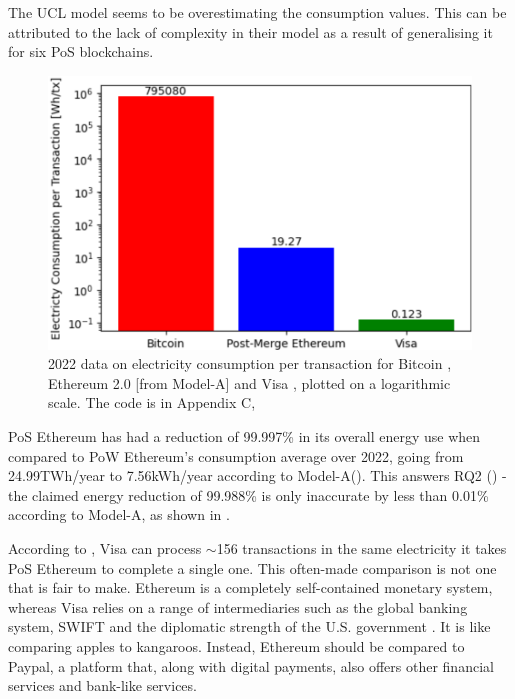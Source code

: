 The UCL model seems to be overestimating the consumption values. This can be attributed to the lack of complexity in their model as a result of generalising it for six PoS blockchains.

\begin{figure}[!htb]
    \includegraphics[width=13cm,center]{Figures/ElectricityConsumptionPlot.png}
    \caption{2022 data on electricity consumption per transaction for Bitcoin \cite{BitcoinDigiconomist}, Ethereum 2.0 [from Model-A] and Visa \cite{2022VisaReport}, \cite{VisaHome} plotted on a logarithmic scale. The code is in Appendix C, }
    \label{Figure:ElectricityConsumptionPlot}
\end{figure}

PoS Ethereum has had a reduction of 99.997\% in its overall energy use when compared to PoW Ethereum's consumption average over 2022, going from 24.99TWh/year to 7.56kWh/year according to Model-A(\cite{CCRIIndices}). This answers RQ2 () - the claimed energy reduction of 99.988\% is only inaccurate by less than 0.01\% according to Model-A, as shown in .

According to , Visa can process 
$\sim$156 transactions in the same electricity it takes PoS Ethereum to complete a single one. This often-made comparison is not one that is fair to make. Ethereum is a completely self-contained monetary system, whereas Visa relies on a range of intermediaries such as the global banking system, SWIFT and the diplomatic strength of the U.S. government \cite{Carter2021BitcoinComparison}. It is like comparing apples to kangaroos. Instead, Ethereum should be compared to Paypal, a platform that, along with digital payments, also offers other financial services and bank-like services.  

